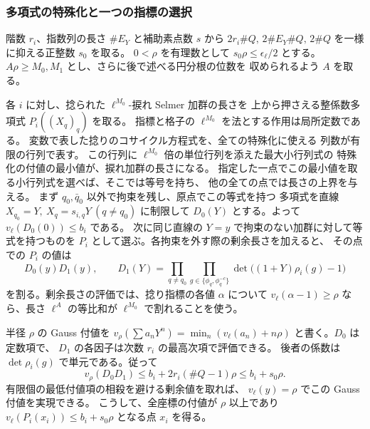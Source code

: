 \subsubsection{多項式の特殊化と一つの指標の選択}

階数 \(r_i\)、指数列の長さ \(\#E_Y\) と補助素点数 \(s\) から
\(2r_i\#Q,\,2\#E_Y\#Q,\,2\#Q\) を一様に抑える正整数 \(s_0\) を取る。
\(0<\rho\) を有理数として \(s_0\rho\le\epsilon_\ell/2\) とする。
\(A\rho\ge M_0,M_1\) とし、さらに後で述べる円分根の位数を
収められるよう \(A\) を取る。

各 \(i\) に対し、捻られた \(\ell^{M_0}\)-捩れ Selmer 加群の長さを
上から押さえる整係数多項式 \(P_i((X_q)_q)\) を取る。
指標と格子の \(\ell^{M_0}\) を法とする作用は局所定数である。
変数で表した捻りのコサイクル方程式を、全ての特殊化に使える
列数が有限の行列で表す。
この行列に \(\ell^{M_0}\) 倍の単位行列を添えた最大小行列式の
特殊化の付値の最小値が、捩れ加群の長さになる。
指定した一点でこの最小値を取る小行列式を選べば、そこでは等号を持ち、
他の全ての点では長さの上界を与える。
まず \(q_0,\bar q_0\) 以外で拘束を残し、原点でこの等式を持つ
多項式を直線 \(X_{q_0}=Y,\ X_q=s_{i,q}Y\ (q\ne q_0)\) に制限して
\(D_0(Y)\) とする。よって \(v_\ell(D_0(0))\le b_i\) である。
次に同じ直線の \(Y=y\) で拘束のない加群に対して等式を持つものを
\(P_i\) として選ぶ。各拘束を外す際の剰余長さを加えると、
その点での \(P_i\) の値は
\[
 D_0(y)D_1(y),\qquad
 D_1(Y)=\prod_{q\ne q_0}\prod_{g\in\{\phi_q,\phi_q^{-c}\}}
              \det\big((1+Y)\rho_i(g)-1\big)
\]
を割る。剰余長さの評価では、捻り指標の各値 \(\alpha\) について
\(v_\ell(\alpha-1)\ge\rho\) なら、長さ \(\ell^A\) の等比和が
\(\ell^{M_0}\) で割れることを使う。

半径 \(\rho\) の Gauss 付値を \(v_\rho(\sum a_nY^n)
=\min_n(v_\ell(a_n)+n\rho)\) と書く。\(D_0\) は定数項で、
\(D_1\) の各因子は次数 \(r_i\) の最高次項で評価できる。
後者の係数は \(\det\rho_i(g)\) で単元である。従って
\[
 v_\rho(D_0D_1)\le b_i+2r_i(\#Q-1)\rho\le b_i+s_0\rho .
\]
有限個の最低付値項の相殺を避ける剰余値を取れば、
\(v_\ell(y)=\rho\) でこの Gauss 付値を実現できる。
こうして、全座標の付値が \(\rho\) 以上であり
\(v_\ell(P_i(x_i))\le b_i+s_0\rho\) となる点 \(x_i\) を得る。

